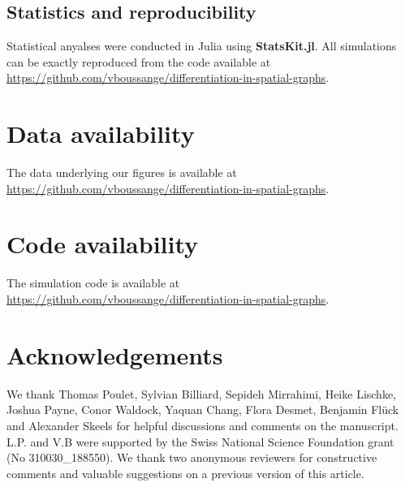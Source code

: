 \subsection{Statistics and reproducibility}
Statistical anyalses were conducted in Julia using \textbf{StatsKit.jl}. 
%
All simulations can be exactly reproduced from the code available at \href{https://github.com/vboussange/differentiation-in-spatial-graphs}{https://github.com/vboussange/differentiation-in-spatial-graphs}.

\section{Data availability}
The data underlying our figures is available at \href{https://github.com/vboussange/differentiation-in-spatial-graphs}{https://github.com/vboussange/differentiation-in-spatial-graphs}.

\section{Code availability}

The simulation code is available at \href{https://github.com/vboussange/differentiation-in-spatial-graphs}{https://github.com/vboussange/differentiation-in-spatial-graphs}.


\section{Acknowledgements}
We thank Thomas Poulet, Sylvian Billiard, Sepideh Mirrahimi, Heike Lischke, Joshua Payne, Conor Waldock, Yaquan Chang, Flora Desmet, Benjamin Flück and Alexander Skeels for helpful discussions and comments on the manuscript. L.P. and V.B were supported by the Swiss National Science Foundation grant (No 310030\_188550).
We thank two anonymous reviewers for constructive comments and valuable suggestions on a previous version of this article.
  
  
